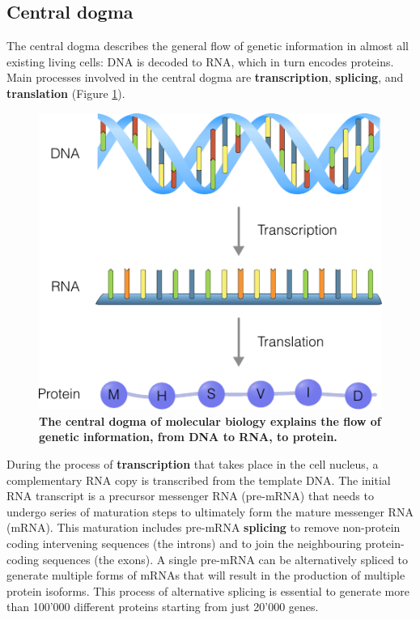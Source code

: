 \subsection{Central dogma}
The central dogma describes the general flow of genetic information in almost all existing living cells: DNA is decoded to RNA, which in turn encodes proteins\cite{strachan_humanmoleculargenetics_2011}. Main processes involved in the central dogma are \textbf{transcription}, \textbf{splicing}, and \textbf{translation} (Figure \ref{fig:centraldogma}). 

\begin{figure}[htb!]
	\centering
	\includegraphics[width=.8\linewidth]{fig/central_dogma.pdf}
	\caption{	
		\textbf{The central dogma of molecular biology explains the flow of genetic information, from DNA to RNA, to protein.}
	}
	\label{fig:centraldogma}
\end{figure}

During the process of \textbf{transcription} that takes place in the cell nucleus, a complementary RNA copy is transcribed from the template DNA. The initial RNA transcript is a precursor messenger RNA (pre-mRNA) that needs to undergo series of maturation steps to ultimately form the mature messenger RNA (mRNA). This maturation includes pre-mRNA \textbf{splicing} to remove non-protein coding intervening sequences (the introns) and to join the neighbouring protein-coding sequences (the exons). A single pre-mRNA can be alternatively spliced to generate multiple forms of mRNAs that will result in the production of multiple protein isoforms. This process of alternative splicing is essential to generate more than 100'000 different proteins starting from just 20'000 genes\cite{nilsen_expansioneukaryoticproteome_2010}.

